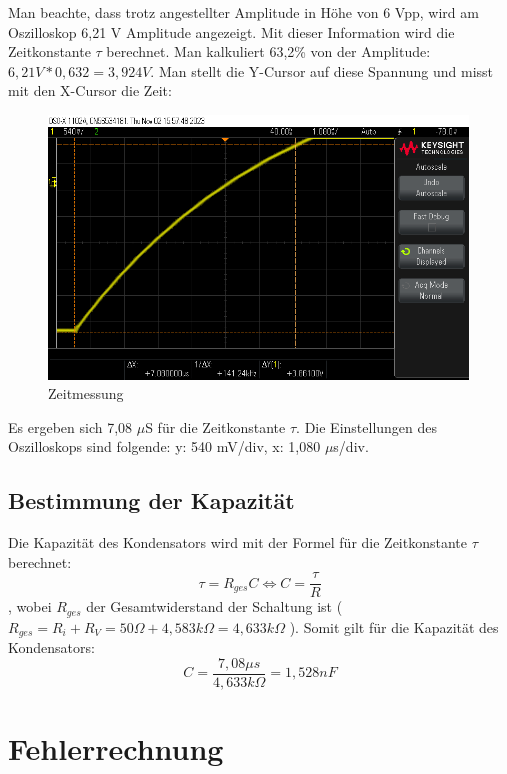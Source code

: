 Man beachte, dass trotz angestellter Amplitude in Höhe von
6 Vpp, wird am Oszilloskop 6,21 V Amplitude angezeigt. Mit dieser 
Information wird die Zeitkonstante $\tau$ berechnet. Man kalkuliert
63,2\% von der Amplitude: $6,21V * 0,632 = 3,924V$. Man stellt die 
Y-Cursor auf diese Spannung und misst mit den X-Cursor die Zeit:
\begin{figure}[H]
	\centering
	\includegraphics[height=7cm]{images/Versuch1/Zeitmessung.png} 
	\caption{Zeitmessung}
	\label{fig: Zeitmessung}
\end{figure}

Es ergeben sich 7,08 $\mu$S für die Zeitkonstante $\tau$. Die
Einstellungen des Oszilloskops sind folgende:
y: 540 mV/div, x: 1,080 $\mu$s/div.

\subsection{Bestimmung der Kapazität}

Die Kapazität des Kondensators wird mit der Formel für die Zeitkonstante $\tau$
berechnet:
\[
	\tau = R_{ges}C \Leftrightarrow C = \frac{\tau}{R}
\], wobei $R_{ges}$ der Gesamtwiderstand der Schaltung ist
($R_{ges} = R_{i} + R_{V} = 50\Omega + 4,583 k\Omega = 4,633 k\Omega$ ).
Somit gilt für die Kapazität des Kondensators:
\[
	C = \frac{7,08 \mu s}{4,633 k\Omega} = 1,528 nF
\]


\section{Fehlerrechnung}


